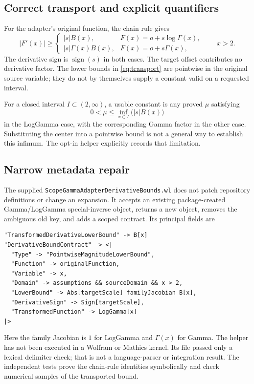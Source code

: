 \documentclass[11pt,letterpaper]{article}
\newcommand{\code}[1]{{\small\nolinkurl{#1}}}
\begin{document}
\subsection{Correct transport and explicit quantifiers}

For the adapter's original function, the chain rule gives
\begin{equation}
 |F'(x)|\ge
 \begin{cases}
 |s|B(x),&F(x)=o+s\log\Gamma(x),\\
 |s|\Gamma(x)B(x),&F(x)=o+s\Gamma(x),
 \end{cases}
 \qquad x>2.
 \label{eq:transport}
\end{equation}
The derivative sign is $\operatorname{sign}(s)$ in both cases. The target offset contributes no derivative factor. The lower bounds in \eqref{eq:transport} are pointwise in the original source variable; they do not by themselves supply a constant valid on a requested interval.

For a closed interval $I\subset(2,\infty)$, a usable constant is any proved $\mu$ satisfying
\[
 0<\mu\le\inf_{x\in I}\bigl(|s|B(x)\bigr)
\]
in the LogGamma case, with the corresponding Gamma factor in the other case. Substituting the center into a pointwise bound is not a general way to establish this infimum. The opt-in helper explicitly records that limitation.

\subsection{Narrow metadata repair}

The supplied \code{ScopeGammaAdapterDerivativeBounds.wl} does not patch repository definitions or change an expansion. It accepts an existing package-created Gamma/LogGamma special-inverse object, returns a new object, removes the ambiguous old key, and adds a scoped contract. Its principal fields are
\begin{lstlisting}
"TransformedDerivativeLowerBound" -> B[x]
"DerivativeBoundContract" -> <|
  "Type" -> "PointwiseMagnitudeLowerBound",
  "Function" -> originalFunction,
  "Variable" -> x,
  "Domain" -> assumptions && sourceDomain && x > 2,
  "LowerBound" -> Abs[targetScale] familyJacobian B[x],
  "DerivativeSign" -> Sign[targetScale],
  "TransformedFunction" -> LogGamma[x]
|>
\end{lstlisting}
Here the family Jacobian is $1$ for LogGamma and $\Gamma(x)$ for Gamma. The helper has not been executed in a Wolfram or Mathics kernel. Its file passed only a lexical delimiter check; that is not a language-parser or integration result. The independent tests prove the chain-rule identities symbolically and check numerical samples of the transported bound.
\end{document}
